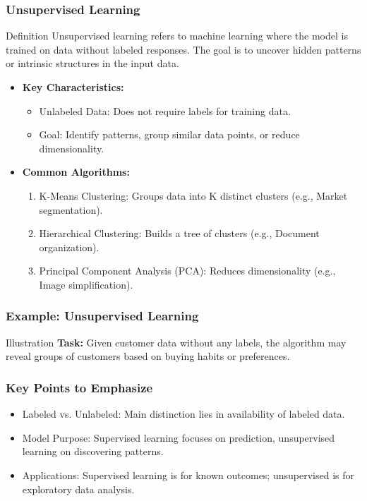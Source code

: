 \documentclass[aspectratio=169]{beamer}
\begin{document}
\begin{frame}[fragile]
    \frametitle{Unsupervised Learning}

    \begin{block}{Definition}
        Unsupervised learning refers to machine learning where the model is trained on data without labeled responses. The goal is to uncover hidden patterns or intrinsic structures in the input data.
    \end{block}

    \begin{itemize}
        \item \textbf{Key Characteristics:}
        \begin{itemize}
            \item Unlabeled Data: Does not require labels for training data.
            \item Goal: Identify patterns, group similar data points, or reduce dimensionality.
        \end{itemize}
        
        \item \textbf{Common Algorithms:}
        \begin{enumerate}
            \item K-Means Clustering: Groups data into K distinct clusters (e.g., Market segmentation).
            \item Hierarchical Clustering: Builds a tree of clusters (e.g., Document organization).
            \item Principal Component Analysis (PCA): Reduces dimensionality (e.g., Image simplification).
        \end{enumerate}
    \end{itemize}
\end{frame}

\begin{frame}[fragile]
    \frametitle{Example: Unsupervised Learning}

    \begin{block}{Illustration}
        \textbf{Task:} Given customer data without any labels, the algorithm may reveal groups of customers based on buying habits or preferences.
    \end{block}
\end{frame}

\begin{frame}[fragile]
    \frametitle{Key Points to Emphasize}

    \begin{itemize}
        \item Labeled vs. Unlabeled: Main distinction lies in availability of labeled data.
        \item Model Purpose: Supervised learning focuses on prediction, unsupervised learning on discovering patterns.
        \item Applications: Supervised learning is for known outcomes; unsupervised is for exploratory data analysis.
    \end{itemize}
\end{frame}
\end{document}
